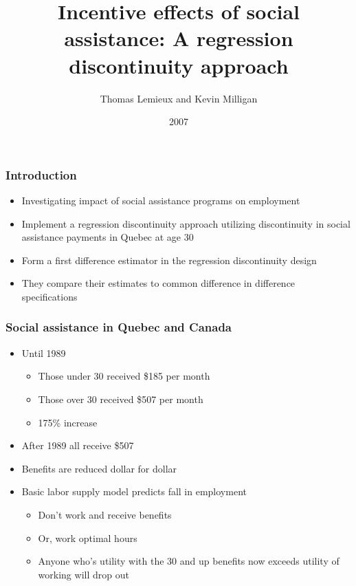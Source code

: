 \documentclass{beamer}
\title{Incentive effects of social assistance: A regression discontinuity approach}
\author{Thomas Lemieux and Kevin Milligan}
\institute{Journal of Econometrics}
\date{2007}
\begin{document}
	


	
	\frame{\titlepage}
	





\begin{frame}
\frametitle{Introduction}

\begin{itemize}
		\setlength{\itemsep}{5mm}
	\item Investigating impact of social assistance programs on employment 
	\item Implement a regression discontinuity approach utilizing discontinuity in social assistance payments in Quebec at age 30
	\item Form a first difference estimator in the regression discontinuity design
	\item They compare their estimates to common difference in difference specifications 
\end{itemize}


\end{frame}



\begin{frame}
\frametitle{Social assistance in Quebec and Canada }

\begin{itemize}
	\setlength{\itemsep}{5mm}
	\item Until 1989 
	\begin{itemize}
		\setlength{\itemsep}{3mm}
		\item Those under 30 received \$185 per month
		\item Those over 30 received \$507 per month
		\item 175\% increase 
	\end{itemize}

\item After 1989 all receive \$507 
\item Benefits are reduced dollar for dollar

\item Basic labor supply model predicts fall in employment 
\begin{itemize}
	\item Don't work and receive benefits
	\item Or, work optimal hours 
	\item Anyone who's utility with the 30 and up benefits now exceeds utility of working will drop out 
\end{itemize}

\end{itemize}
\end{frame}
\end{document}
